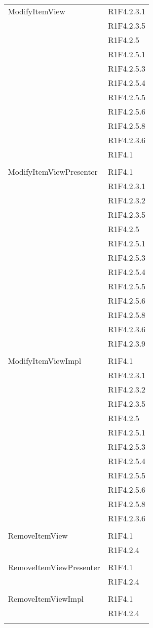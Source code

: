 \begin{center}
\begin{longtable}{|p{7cm}|p{5cm}|}
		ModifyItemView & R1F4.2.3.1 \\ & R1F4.2.3.5 \\ & R1F4.2.5 \\ & R1F4.2.5.1 \\ & R1F4.2.5.3 \\ & R1F4.2.5.4 \\ & R1F4.2.5.5 \\ & R1F4.2.5.6 \\ & R1F4.2.5.8 \\ & R1F4.2.3.6 \\ & R1F4.1 \\ & \\ \hline
		ModifyItemViewPresenter & R1F4.1 \\ & R1F4.2.3.1 \\ & R1F4.2.3.2 \\ & R1F4.2.3.5 \\ & R1F4.2.5 \\ & R1F4.2.5.1 \\ & R1F4.2.5.3 \\ & R1F4.2.5.4 \\ & R1F4.2.5.5 \\ & R1F4.2.5.6 \\ & R1F4.2.5.8 \\ & R1F4.2.3.6 \\ & R1F4.2.3.9 \\ & \\ \hline
		ModifyItemViewImpl & R1F4.1 \\ & R1F4.2.3.1 \\ & R1F4.2.3.2 \\ & R1F4.2.3.5 \\ & R1F4.2.5 \\ & R1F4.2.5.1 \\ & R1F4.2.5.3 \\ & R1F4.2.5.4 \\ & R1F4.2.5.5 \\ & R1F4.2.5.6 \\ & R1F4.2.5.8 \\ & R1F4.2.3.6 \\ & \\ \hline
		RemoveItemView & R1F4.1 \\ & R1F4.2.4 \\ & \\ \hline
		RemoveItemViewPresenter & R1F4.1 \\ & R1F4.2.4 \\ & \\ \hline
		RemoveItemViewImpl & R1F4.1 \\ & R1F4.2.4 \\ & \\ \hline

\end{longtable}
\end{center}
